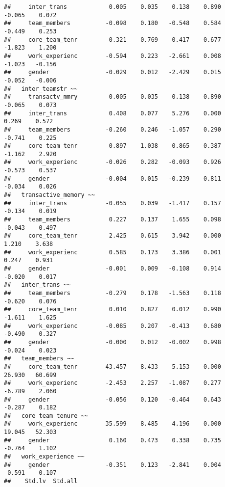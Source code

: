 \documentclass[]{article}
\begin{document}
\begin{verbatim}
##     inter_trans            0.005    0.035    0.138    0.890   -0.065    0.072
##     team_members          -0.098    0.180   -0.548    0.584   -0.449    0.253
##     core_team_tenr        -0.321    0.769   -0.417    0.677   -1.823    1.200
##     work_experienc        -0.594    0.223   -2.661    0.008   -1.023   -0.156
##     gender                -0.029    0.012   -2.429    0.015   -0.052   -0.006
##   inter_teamstr ~~                                                           
##     transactv_mmry         0.005    0.035    0.138    0.890   -0.065    0.073
##     inter_trans            0.408    0.077    5.276    0.000    0.269    0.572
##     team_members          -0.260    0.246   -1.057    0.290   -0.741    0.225
##     core_team_tenr         0.897    1.038    0.865    0.387   -1.162    2.920
##     work_experienc        -0.026    0.282   -0.093    0.926   -0.573    0.537
##     gender                -0.004    0.015   -0.239    0.811   -0.034    0.026
##   transactive_memory ~~                                                      
##     inter_trans           -0.055    0.039   -1.417    0.157   -0.134    0.019
##     team_members           0.227    0.137    1.655    0.098   -0.043    0.497
##     core_team_tenr         2.425    0.615    3.942    0.000    1.210    3.638
##     work_experienc         0.585    0.173    3.386    0.001    0.247    0.931
##     gender                -0.001    0.009   -0.108    0.914   -0.020    0.017
##   inter_trans ~~                                                             
##     team_members          -0.279    0.178   -1.563    0.118   -0.620    0.076
##     core_team_tenr         0.010    0.827    0.012    0.990   -1.611    1.625
##     work_experienc        -0.085    0.207   -0.413    0.680   -0.490    0.327
##     gender                -0.000    0.012   -0.002    0.998   -0.024    0.023
##   team_members ~~                                                            
##     core_team_tenr        43.457    8.433    5.153    0.000   26.930   60.699
##     work_experienc        -2.453    2.257   -1.087    0.277   -6.789    2.060
##     gender                -0.056    0.120   -0.464    0.643   -0.287    0.182
##   core_team_tenure ~~                                                        
##     work_experienc        35.599    8.485    4.196    0.000   19.045   52.303
##     gender                 0.160    0.473    0.338    0.735   -0.764    1.102
##   work_experience ~~                                                         
##     gender                -0.351    0.123   -2.841    0.004   -0.591   -0.107
##    Std.lv  Std.all

\end{verbatim}
\end{document}
